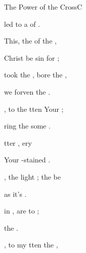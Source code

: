 \documentclass[12pt]{book}
\begin{document}
\begin{song}{The Power of the Cross}{C}
\begin{SBExtraKeys}
{\begin{SBVerse}
        led to a  of .

    \end{SBVerse}

    \begin{SBChorus}

        This, the  of the ,

        Christ be sin for ;

        took the , bore the ,

        we  forven  the . 
            \Ch{[Em}{}  \Ch{C]}{}

    \end{SBChorus}

    \begin{SBVerse}
        
        , to  the  
            tten  Your ; 

        ring the some
              .

         tter , 
            ery  

         Your -stained .

    \end{SBVerse}

    \begin{SBVerse}
        
        , the light ; 
             the  be

         as it's 
              .

          in , 
             are  to ;

         the  .

    \end{SBVerse}

    \begin{SBVerse}
        
        , to  my  
            tten  the , 


\end{SBVerse}}
\end{SBExtraKeys}
\end{song}
\end{document}
